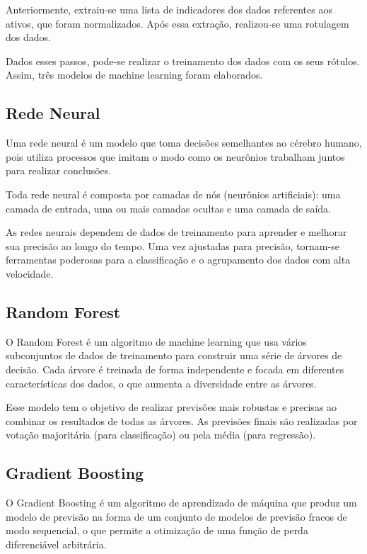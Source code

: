 \documentclass{article}
\begin{document}
Anteriormente, extraiu-se uma lista de indicadores dos dados referentes aos ativos, que foram normalizados. Após essa extração, realizou-se uma rotulagem dos dados. 

Dados esses passos, pode-se realizar o treinamento dos dados com os seus rótulos. Assim, três modelos de machine learning foram elaborados.

\subsection{Rede Neural}

Uma rede neural é um modelo que toma decisões semelhantes ao cérebro humano, pois utiliza processos que imitam o modo como os neurônios trabalham juntos para realizar conclusões.

Toda rede neural é composta por camadas de nós (neurônios artificiais): uma camada de entrada, uma ou mais camadas ocultas e uma camada de saída.

As redes neurais dependem de dados de treinamento para aprender e melhorar sua precisão ao longo do tempo. Uma vez ajustadas para precisão, tornam-se ferramentas poderosas para a classificação e o agrupamento dos dados com alta velocidade. 

\subsection{Random Forest}

O Random Forest é um algoritmo de machine learning que usa vários subconjuntos de dados de treinamento para construir uma série de árvores de decisão. Cada árvore é treinada de forma independente e focada em diferentes características dos dados, o que aumenta a diversidade entre as árvores.

Esse modelo tem o objetivo de realizar previsões mais robustas e precisas ao combinar os resultados de todas as árvores. As previsões finais são realizadas por votação majoritária (para classificação) ou pela média (para regressão).

\subsection{Gradient Boosting}

O Gradient Boosting é um algoritmo de aprendizado de máquina que produz um modelo de previsão na forma de um conjunto de modelos de previsão fracos de modo sequencial, o que permite a otimização de uma função de perda diferenciável arbitrária.
\end{document}

